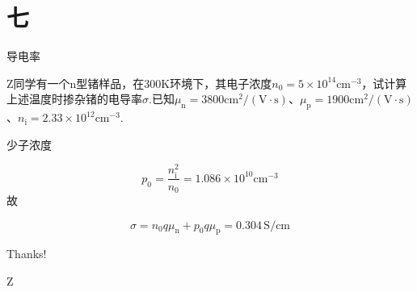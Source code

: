 \documentclass{beamer}
\begin{document}
\section{七}
\begin{frame}[t]{导电率}

    {
        \kaishu
        \qquad Z同学有一个n型锗样品，在300K环境下，其电子浓度$n_0=5\times10^{14}\text{cm}^{-3}$，试计算上述温度时掺杂锗的电导率$\sigma$.已知$\mu_\text{n}=3800 \text{cm}^2/(\text{V}·\text{s})$、$ \mu_\text{p}=1900 \text{cm}^2/(\text{V}·\text{s})$、$ n_\text{i}=2.33×10^{12}\text{cm}^{-3}$.
    }\par

    \vspace{0.2cm}
    \qquad 少子浓度\par
    \vspace{-0.1cm}
    \[
        p_0 = \frac{n_\text{i}^2}{n_0} = 1.086 \times 10^{10} \text{cm}^{-3}
    \]
    \vspace{-0.1cm}
    故\par
    \[
        \sigma = n_0 q \mu_\text{n} + p_0 q \mu_\text{p} = 0.304 \, \text{S/cm}
    \]
    
\end{frame}

\begin{frame}
    \thispagestyle{empty}
    \begin{center}
        \vspace{1.75cm}
        {\Huge\calligra Thanks!}\par
        \vspace{1.5cm}
        {\Large \calligra Z}
    \end{center}
\end{frame}
\end{document}
